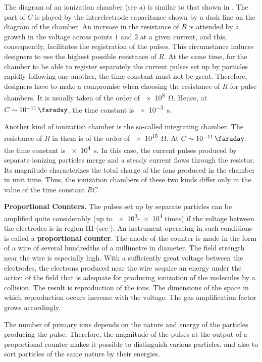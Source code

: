 The diagram of an ionization chamber (see a) is similar to that shown in .
The part of $C$ is played by the interelectrode capacitance shown by a dash line on the diagram of the chamber.
An increase in the resistance of $R$ is attended by a growth in the voltage across points $1$ and $2$ at a given current, and this, consequently, facilitates the registration of the pulses.
This circumstance induces designers to use the highest possible resistance of $R$.
At the same time, for the chamber to be able to register separately the current pulses set up by particles rapidly following one another, the time constant must not be great.
Therefore, designers have to make a compromise when choosing the resistance of $R$ for pulse chambers.
It is usually taken of the order of \SI{e8}{\ohm}.
Hence, at $C\sim\SI{e-11}{\faraday}$, the time constant is \SI{e-3}{\second}.

Another kind of ionization chamber is the so-called integrating chamber.
The resistance of $R$ in them is of the order of \SI{e15}{\ohm}.
At $C\sim\SI{e-11}{\faraday}$, the time constant is \SI{e4}{\second}.
In this case, the current pulses produced by separate ionizing particles merge and a steady
current flows through the resistor.
Its magnitude characterizes the total charge of the ions produced in the chamber in unit time.
Thus, the ionization chambers of these two kinds differ only in the value of the time constant $RC$.

\textbf{Proportional Counters.} The pulses set up by separate particles can be amplified quite considerably (up to \num{e3}-\num{e4} times) if the voltage between the electrodes is in region III (see ).
An instrument operating in such conditions is called a \textbf{proportional counter}.
The anode of the counter is made in the form of a wire of several hundredths of a millimetre in diameter.
The field strength near the wire is especially high.
With a sufficiently great voltage between the electrodes, the electrons produced near the wire acquire an energy under the action of the field that is adequate for producing ionization of the molecules by a collision.
The result is reproduction of the ions. The dimensions of the space in which reproduction occurs increase with the voltage. The gas amplification factor grows accordingly.

The number of primary ions depends on the nature and energy of the particles producing the pulse. Therefore, the magnitude of the pulses at the output of a proportional counter makes it possible to distinguish various particles, and also to sort particles of the same nature by their energies.

